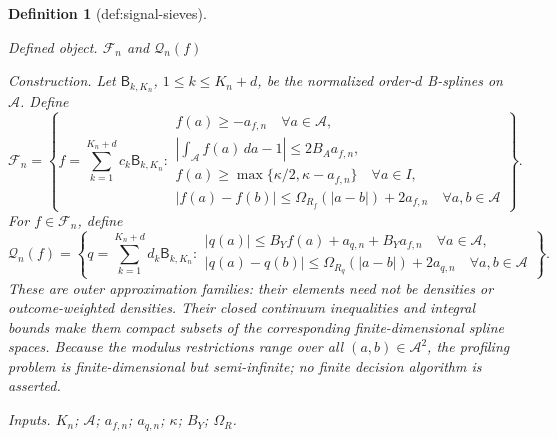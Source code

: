 \documentclass{article}
\newtheorem{definition}{Definition}
\begin{document}
\begin{definition}[def:signal-sieves]\label{def:signal-sieves}
\par\smallskip\noindent\emph{Defined object.} \(\mathscr F_n\) and \(\mathscr Q_n(f)\)
\par\smallskip\noindent\emph{Construction.} Let \(\mathsf B_{k,K_n}\), \(1\le k\le K_n+d\), be the normalized order-\(d\) B-splines on \(\mathcal A\). Define
\[
 \mathscr F_n=\left\{f=\sum_{k=1}^{K_n+d}c_k\mathsf B_{k,K_n}:
 \begin{array}{l}
 f(a)\ge-a_{f,n}\quad\forall a\in\mathcal A,\\
 \left|\int_{\mathcal A}f(a)\,da-1\right|\le2B_Aa_{f,n},\\
 f(a)\ge\max\{\kappa/2,\kappa-a_{f,n}\}\quad\forall a\in I,\\
 |f(a)-f(b)|\le\Omega_{R_f}(|a-b|)+2a_{f,n}
 \quad\forall a,b\in\mathcal A
 \end{array}
 \right\}.
\]
For \(f\in\mathscr F_n\), define
\[
 \mathscr Q_n(f)=\left\{q=\sum_{k=1}^{K_n+d}d_k\mathsf B_{k,K_n}:
 \begin{array}{l}
 |q(a)|\le B_Yf(a)+a_{q,n}+B_Ya_{f,n}\quad\forall a\in\mathcal A,\\
 |q(a)-q(b)|\le\Omega_{R_q}(|a-b|)+2a_{q,n}
 \quad\forall a,b\in\mathcal A
 \end{array}
 \right\}.
\]
These are outer approximation families: their elements need not be densities or outcome-weighted densities. Their closed continuum inequalities and integral bounds make them compact subsets of the corresponding finite-dimensional spline spaces. Because the modulus restrictions range over all \((a,b)\in\mathcal A^2\), the profiling problem is finite-dimensional but semi-infinite; no finite decision algorithm is asserted.
\par\smallskip\noindent\emph{Inputs.} \(K_n\); \(\mathcal A\); \(a_{f,n}\); \(a_{q,n}\); \(\kappa\); \(B_Y\); \(\Omega_R\).
\end{definition}
\end{document}
